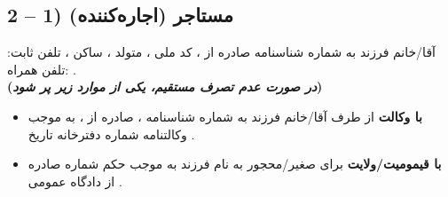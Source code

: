 \documentclass[14pt]{article}
\begin{document}
	\subsection*{2 – 1) مستاجر (اجاره‌کننده)}
	آقا/خانم
	\underline{\hspace{3cm}}
	 فرزند
	\underline{\hspace{2cm}}
	 به شماره شناسنامه
	\underline{\hspace{2cm}}
	 صادره از
	\underline{\hspace{1cm}}
	، کد ملی
	\underline{\hspace{2cm}}
	، متولد
	\underline{\hspace{1cm}}
	، ساکن
	\underline{\hspace{4cm}}
	، تلفن ثابت:
	\underline{\hspace{2cm}}
	 تلفن همراه:
	\underline{\hspace{2cm}}
	.
	\\
	\textbf{(\textit{در صورت عدم تصرف مستقیم، یکی از موارد زیر پر شود})}
	\begin{itemize}
		\item 
		\textbf{با وکالت}
		از طرف آقا/خانم 
		\underline{\hspace{4cm}}
		فرزند 
		\underline{\hspace{1.5cm}}
		به شماره شناسنامه 
		\underline{\hspace{2cm}}
		، صادره از 
		\underline{\hspace{2cm}}
		، به موجب وکالتنامه شماره 
		\underline{\hspace{2cm}}
		دفترخانه 
		\underline{\hspace{2cm}}
		تاریخ 
		\underline{\hspace{2cm}}
		.
		\item 
		\textbf{با قیمومیت/ولایت}
		برای صغیر/محجور به نام 
		\underline{\hspace{2.5cm}}
		فرزند 
		\underline{\hspace{2cm}}
		به موجب حکم شماره 
		\underline{\hspace{2cm}}
		صادره از دادگاه عمومی 
		\underline{\hspace{2cm}}
		.
	\end{itemize}
	
\end{document}
